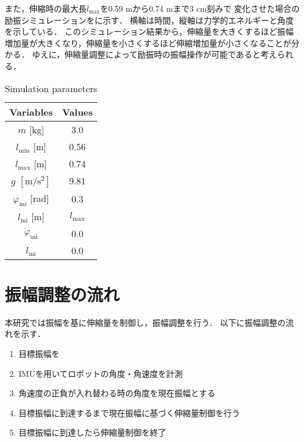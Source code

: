           また，伸縮時の最大長$l_{\mathrm{max}}$を0.59 mから0.74 mまで3 cm刻みで
          変化させた場合の励振シミュレーションをに示す．
          横軸は時間，縦軸は力学的エネルギーと角度を示している．
          このシミュレーション結果から，伸縮量を大きくするほど振幅増加量が大きくなり，伸縮量を小さくするほど伸縮増加量が小さくなることが分かる．
          ゆえに，伸縮量調整によって励振時の振幅操作が可能であると考えられる．
          \begin{table}[tb]
            \begin{center}
              \caption{Simulation parameters}
              \vspace{2mm}
              \begin{tabular}{c|c}
                \hline
                Variables & Values \\
                \hline
                $m$ [kg] & 3.0 \\
                $l_{\mathrm{min}}$ [m] & 0.56 \\
                $l_{\mathrm{max}}$ [m] & 0.74 \\
                $g$ $\mathrm{[m/s^2]}$ & 9.81 \\
                $\varphi_{\mathrm{ini}}$ [rad] & 0.3 \\
                $l_{\mathrm{ini}}$ [m]& $l_{\mathrm{max}}$ \\
                $\dot{\varphi}_{\mathrm{ini}}$ & 0.0 \\
                $\dot{l}_{\mathrm{ini}}$ & 0.0 \\
                \hline
              \end{tabular}
            \end{center}
          \end{table}
        
          
        \newpage
        \section{振幅調整の流れ}

          本研究では振幅を基に伸縮量を制御し，振幅調整を行う．
          以下に振幅調整の流れを示す．
          \begin{enumerate}
            \item 目標振幅を
            \item IMUを用いてロボットの角度・角速度を計測
            \item 角速度の正負が入れ替わる時の角度を現在振幅とする
            \item 目標振幅に到達するまで現在振幅に基づく伸縮量制御を行う
            \item 目標振幅に到達したら伸縮量制御を終了
          \end{enumerate}

